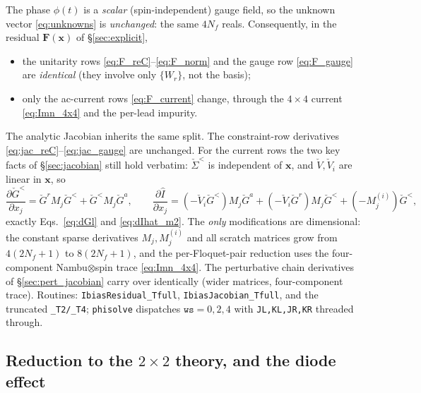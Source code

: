 \documentclass[11pt,a4paper]{article}
\begin{document}
The phase $\phi(t)$ is a \emph{scalar} (spin-independent) gauge field, so the
unknown vector \eqref{eq:unknowns} is \emph{unchanged}: the same $4N_f$ reals.
Consequently, in the residual $\mathbf F(\mathbf x)$ of \S\ref{sec:explicit},
\begin{itemize}
  \item the unitarity rows \eqref{eq:F_reC}--\eqref{eq:F_norm} and the gauge row
        \eqref{eq:F_gauge} are \emph{identical} (they involve only $\{W_r\}$,
        not the basis);
  \item only the ac-current rows \eqref{eq:F_current} change, through the
        $4\times4$ current \eqref{eq:Imn_4x4} and the per-lead impurity.
\end{itemize}
The analytic Jacobian inherits the same split.  The constraint-row derivatives
\eqref{eq:jac_reC}--\eqref{eq:jac_gauge} are unchanged.  For the current rows the
two key facts of \S\ref{sec:jacobian} still hold verbatim: $\check\Sigma^<$ is
independent of $\mathbf x$, and $\check V,\check V_i$ are linear in $\mathbf x$,
so
\begin{equation}
  \frac{\partial\check G^<}{\partial x_j}=\check G^r M_j\check G^<+\check G^< M_j\check G^a,
  \qquad
  \frac{\partial\hat I}{\partial x_j}
  =(-\check V_i\check G^<)M_j\check G^a+(-\check V_i\check G^r)M_j\check G^<+(-M^{(i)}_j)\check G^<,
  \label{eq:dG_4x4}
\end{equation}
exactly Eqs.~\eqref{eq:dGl} and \eqref{eq:dIhat_m2}.  The \emph{only}
modifications are dimensional: the constant sparse derivatives $M_j,M^{(i)}_j$ and
all scratch matrices grow from $4(2N_f+1)$ to $8(2N_f+1)$, and the
per-Floquet-pair reduction uses the four-component Nambu$\otimes$spin trace
\eqref{eq:Imn_4x4}.  The perturbative chain derivatives of
\S\ref{sec:pert_jacobian} carry over identically (wider matrices, four-component
trace).  Routines: \texttt{IbiasResidual\_Tfull}, \texttt{IbiasJacobian\_Tfull},
and the truncated \texttt{\_T2/\_T4}; \texttt{phisolve} dispatches
$\texttt{ws}=0,2,4$ with \texttt{JL,KL,JR,KR} threaded through.

\subsection{Reduction to the \texorpdfstring{$2\times2$}{2x2} theory, and the diode effect}
\label{sec:ysr_check}
\end{document}
